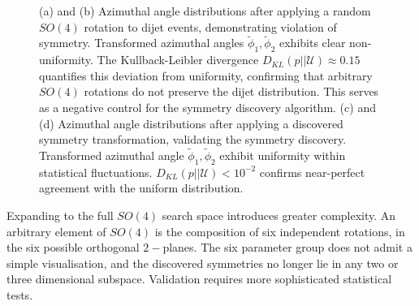 \begin{figure}
\begin{subfigure}[b]{0.45\textwidth}
        \caption{}
        \label{fig:KLsymm_ii}
    \end{subfigure}
    \caption[Non-uniform azimuthal distributions from random $SO(4)$ rotations demonstrating symmetry violation, and uniform azimuthal distributions from discovered symmetry confirming invariance of dijet system.]
    {(a) and (b) Azimuthal angle distributions after applying a random $SO(4)$ rotation to dijet events, demonstrating violation of symmetry. Transformed azimuthal angles $\tilde{\phi}_1, \tilde{\phi}_2$ exhibits clear non-uniformity. The Kullback-Leibler divergence $D_{KL}(p||\mathcal{U}) \approx 0.15$ quantifies this deviation from uniformity, confirming that arbitrary $SO(4)$ rotations do not preserve the dijet distribution. This serves as a negative control for the symmetry discovery algorithm.
    (c) and (d) Azimuthal angle distributions after applying a discovered symmetry transformation, validating the symmetry discovery. Transformed azimuthal angle $\tilde{\phi}_1, \tilde{\phi}_2$ exhibit uniformity within statistical fluctuations. $D_{KL}(p||\mathcal{U}) < 10^{-2}$ confirms near-perfect agreement with the uniform distribution.}
    \label{fig:KL_rand_and_sym}
\end{figure}

             
            Expanding to the full \(SO(4)\) search space introduces greater complexity.
            An arbitrary element of \(SO(4)\) is the composition of six independent rotations, in the six possible orthogonal \(2-\)planes.
            The six parameter group does not admit a simple visualisation, and the discovered symmetries no longer lie in any two or three dimensional subspace.
            Validation requires more sophisticated statistical tests.
            
